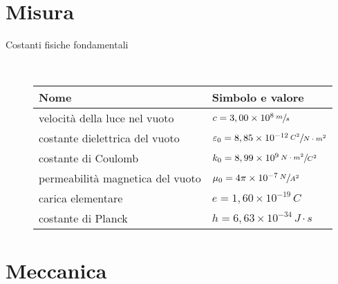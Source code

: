 \documentclass[a4paper,11pt,italian]{article}
\begin{document}
\section{Misura}
\begin{description}
  
  \item[Costanti fisiche fondamentali] ~
  
  \begin{table}[h]\centering
    \begin{tabular}{ll}\toprule
      \textbf{Nome} & \textbf{Simbolo e valore}\\\midrule
      velocità della luce nel vuoto & $ c = 3,00 \times 10^8 \,	\sfrac{m}{s} $ \\\addlinespace[.2em]
      costante dielettrica del vuoto & $ \varepsilon_0 = 8,85\times 10^{-12} \, \sfrac{C^2}{N \cdot m^2} $ \\\addlinespace[.2em]
      costante di Coulomb & $ k_0 = 8,99 \times 10^9 \, \sfrac{N \cdot m^2}{C^2} $ \\\addlinespace[.2em]
      permeabilità magnetica del vuoto & $ \mu_0 = 4\pi \times 10^{-7} \, \sfrac{N}{A^2} $ \\\addlinespace[.2em]
      carica elementare & $ e = 1,60 \times 10^{-19} \, C $ \\\addlinespace[.2em]
      costante di Planck & $ h = 6,63 \times 10^{-34} \, J\cdot s $ \\\bottomrule
    \end{tabular}
  \end{table}  
\end{description}
   
\section{Meccanica}
\end{document}
